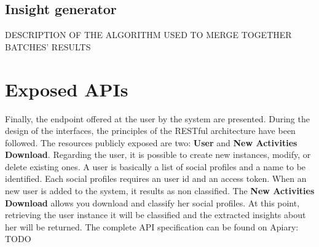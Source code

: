 \subsection{Insight generator}
DESCRIPTION OF THE ALGORITHM USED TO MERGE TOGETHER BATCHES' RESULTS


\section{Exposed APIs}
Finally, the endpoint offered at the user by the system are presented. During the design of the interfaces, the principles of the RESTful architecture have been followed.
The resources publicly exposed are two: \textbf{User} and \textbf{New Activities Download}.
Regarding the user, it is possible to create new instances, modify, or delete existing ones.
A user is basically a list of social profiles and a name to be identified. Each social profiles requires an user id and an access token.
When an new user is added to the system, it results as non classified. The \textbf{New Activities Download} allows you download and classify her social profiles.
At this point, retrieving the user instance it will be classified and the extracted insights about her will be returned.
The complete API specification can be found on Apiary: TODO
